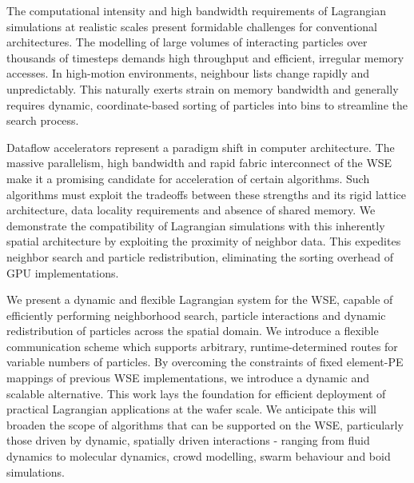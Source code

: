 \documentclass[review, anonymous, acmsmall]{acmart}
\begin{document}
The computational intensity and high bandwidth requirements of Lagrangian simulations at realistic scales present formidable challenges for conventional architectures.
The modelling of large volumes of interacting particles over thousands of timesteps demands high throughput and efficient, irregular memory accesses.
In high-motion environments, neighbour lists change rapidly and unpredictably. 
This naturally exerts strain on memory bandwidth and generally requires dynamic, coordinate-based sorting of particles into bins to streamline the search process.

Dataflow accelerators represent a paradigm shift in computer architecture.
The massive parallelism, high bandwidth and rapid fabric interconnect of the WSE make it a promising candidate for acceleration of certain algorithms.
Such algorithms must exploit the tradeoffs between these strengths and its rigid lattice architecture, data locality requirements and absence of shared memory.
We demonstrate the compatibility of Lagrangian simulations with this inherently spatial architecture by exploiting the proximity of neighbor data. 
This expedites neighbor search and particle redistribution, eliminating the sorting overhead of GPU implementations.

We present a dynamic and flexible Lagrangian system for the WSE, capable of efficiently performing neighborhood search, particle interactions and dynamic redistribution of particles across the spatial domain. 
We introduce a flexible communication scheme which supports arbitrary, runtime-determined routes for variable numbers of particles. 
By overcoming the constraints of fixed element-PE mappings of previous WSE implementations, we introduce a dynamic and scalable alternative. 
This work lays the foundation for efficient deployment of practical Lagrangian applications at the wafer scale. 
We anticipate this will broaden the scope of algorithms that can be supported on the WSE, particularly those driven by dynamic, spatially driven interactions - ranging from fluid dynamics to molecular dynamics, crowd modelling, swarm behaviour and boid simulations. 
\end{document}

